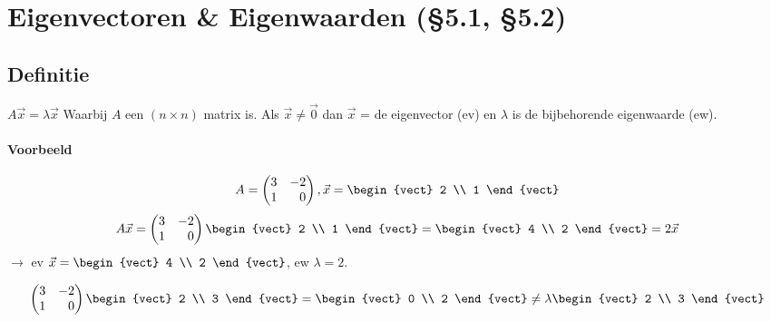 \section{Eigenvectoren \& Eigenwaarden (\S5.1, \S5.2)} \label{sec:eigen}
\subsection{Definitie}
$A \vec{x} = \lambda \vec{x}$ Waarbij $A$ een $(n \times n)$ matrix is. Als $\vec{x} \neq \vec{0}$ dan $\vec{x}$ = de eigenvector (ev) en $\lambda$ is de bijbehorende eigenwaarde (ew).

\paragraph{Voorbeeld}
\[ A = \begin{pmatrix*}[r] 3 & -2 \\ 1 & 0 \end{pmatrix*}, \vec{x} = \begin{vect} 2 \\ 1 \end{vect} \]
\[ A \vec{x} = \begin{pmatrix*}[r] 3 & -2 \\ 1 & 0 \end{pmatrix*} \begin{vect} 2 \\ 1 \end{vect} = \begin{vect} 4 \\ 2 \end{vect} = 2 \vec{x} \]
$\to$ ev $\vec{x} = \begin{vect} 4 \\ 2 \end{vect}$, ew $\lambda = 2$.

\[ \begin{pmatrix*}[r] 3 & -2 \\ 1 & 0 \end{pmatrix*} \begin{vect} 2 \\ 3 \end{vect} = \begin{vect} 0 \\ 2 \end{vect} \neq \lambda \begin{vect} 2 \\ 3 \end{vect} \]

